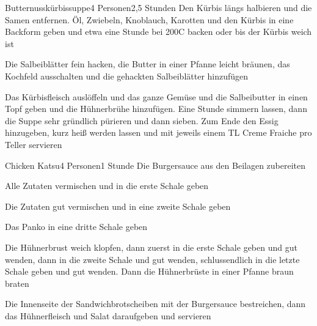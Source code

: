 
\begin{recipe}{Butternusskürbissuppe}{4 Personen}{2,5 Stunden}
Den Kürbis längs halbieren und die Samen entfernen.
Öl, Zwiebeln, Knoblauch, Karotten und den Kürbis in eine Backform geben und etwa eine Stunde bei 200\0C backen oder bis der Kürbis weich ist

Die Salbeiblätter fein hacken, die Butter in einer Pfanne leicht bräunen, das Kochfeld ausschalten und die gehackten Salbeiblätter hinzufügen

Das Kürbisfleisch auslöffeln und das ganze Gemüse und die Salbeibutter in einen Topf geben und die Hühnerbrühe hinzufügen. Eine Stunde simmern lassen, dann die Suppe sehr gründlich pürieren und dann sieben. Zum Ende den Essig hinzugeben, kurz heiß werden lassen und mit jeweils einem TL Creme Fraiche pro Teller servieren
\end{recipe}


\begin{recipe}{Chicken Katsu}{4 Personen}{1 Stunde}
Die Burgersauce aus den Beilagen zubereiten

Alle Zutaten vermischen und in die erste Schale geben

Die Zutaten gut vermischen und in eine zweite Schale geben

Das Panko in eine dritte Schale geben

Die Hühnerbrust weich klopfen, dann zuerst in die erste Schale geben und gut wenden, dann in die zweite Schale und gut wenden, schlussendlich in die letzte Schale geben und gut wenden. Dann die Hühnerbrüste in einer Pfanne braun braten

Die Innenseite der Sandwichbrotscheiben mit der Burgersauce bestreichen, dann das Hühnerfleisch und Salat daraufgeben und servieren
\end{recipe}

